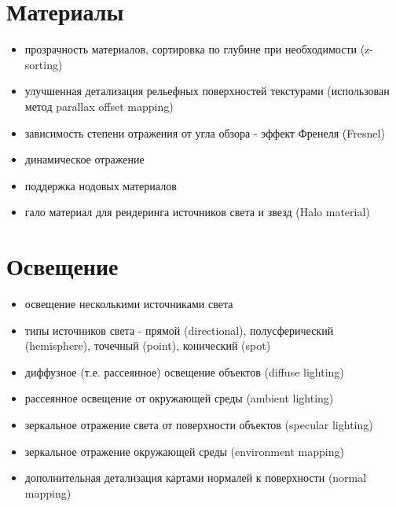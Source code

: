 \documentclass[a4paper,12pt,oneside]{sphinxmanual}
\begin{document}
\section{Материалы}
\label{features:id3}\begin{itemize}
\item {} 
прозрачность материалов, сортировка по глубине при необходимости (z-sorting)

\item {} 
улучшенная детализация рельефных поверхностей текстурами (использован метод parallax offset mapping)

\item {} 
зависимость степени отражения от угла обзора - эффект Френеля (Fresnel)

\item {} 
динамическое отражение

\item {} 
поддержка нодовых материалов

\item {} 
гало материал для рендеринга источников света и звезд (Halo material)

\end{itemize}


\section{Освещение}
\label{features:id4}\begin{itemize}
\item {} 
освещение несколькими источниками света

\item {} 
типы источников света - прямой (directional), полусферический (hemisphere), точечный (point), конический (spot)

\item {} 
диффузное (т.е. рассеянное) освещение объектов (diffuse lighting)

\item {} 
рассеянное освещение от окружающей среды (ambient lighting)

\item {} 
зеркальное отражение света от поверхности объектов (specular lighting)

\item {} 
зеркальное отражение окружающей среды (environment mapping)

\item {} 
дополнительная детализация картами нормалей к поверхности (normal mapping)

\end{itemize}
\end{document}

